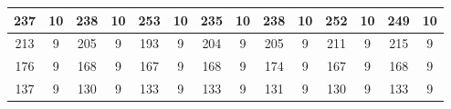 \begin{table}[H]
{\begin{tabular}{|cccccccccccccc|}
\multicolumn{1}{|c|}{237}     & \multicolumn{1}{c|}{10}                                 & \multicolumn{1}{c|}{238}     & \multicolumn{1}{c|}{10}                                 & \multicolumn{1}{c|}{253}      & \multicolumn{1}{c|}{10}                                  & \multicolumn{1}{c|}{235}      & \multicolumn{1}{c|}{10}                                  & \multicolumn{1}{c|}{238}      & \multicolumn{1}{c|}{10}                                  & \multicolumn{1}{c|}{252}      & \multicolumn{1}{c|}{10}                                  & \multicolumn{1}{c|}{249}      & 10                                  \\ \hline
\multicolumn{1}{|c|}{213}     & \multicolumn{1}{c|}{9}                                  & \multicolumn{1}{c|}{205}     & \multicolumn{1}{c|}{9}                                  & \multicolumn{1}{c|}{193}      & \multicolumn{1}{c|}{9}                                   & \multicolumn{1}{c|}{204}      & \multicolumn{1}{c|}{9}                                   & \multicolumn{1}{c|}{205}      & \multicolumn{1}{c|}{9}                                   & \multicolumn{1}{c|}{211}      & \multicolumn{1}{c|}{9}                                   & \multicolumn{1}{c|}{215}      & 9                                   \\ \hline
\multicolumn{1}{|c|}{176}     & \multicolumn{1}{c|}{9}                                  & \multicolumn{1}{c|}{168}     & \multicolumn{1}{c|}{9}                                  & \multicolumn{1}{c|}{167}      & \multicolumn{1}{c|}{9}                                   & \multicolumn{1}{c|}{168}      & \multicolumn{1}{c|}{9}                                   & \multicolumn{1}{c|}{174}      & \multicolumn{1}{c|}{9}                                   & \multicolumn{1}{c|}{167}      & \multicolumn{1}{c|}{9}                                   & \multicolumn{1}{c|}{168}      & 9                                   \\ \hline
\multicolumn{1}{|c|}{137}     & \multicolumn{1}{c|}{9}                                  & \multicolumn{1}{c|}{130}     & \multicolumn{1}{c|}{9}                                  & \multicolumn{1}{c|}{133}      & \multicolumn{1}{c|}{9}                                   & \multicolumn{1}{c|}{133}      & \multicolumn{1}{c|}{9}                                   & \multicolumn{1}{c|}{131}      & \multicolumn{1}{c|}{9}                                   & \multicolumn{1}{c|}{130}      & \multicolumn{1}{c|}{9}                                   & \multicolumn{1}{c|}{133}      & 9                                   \\ \hline

\end{tabular}}
\end{table}
